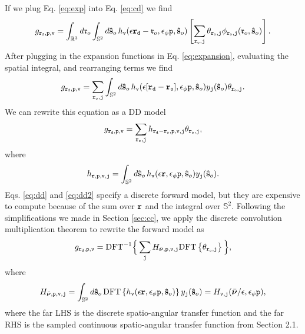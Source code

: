 \documentclass[11pt]{article}
\providecommand{\mb}[1]{\mathbf{#1}}
\providecommand{\ro}{\mathbf{\mathfrak{r}}_o}
\providecommand{\so}{\mathbf{\hat{s}}_o}
\providecommand{\mbb}[1]{\mathbb{#1}}
\providecommand{\bs}[1]{\boldsymbol{#1}}
\providecommand{\tv}{\texttt{v}}
\providecommand{\tb}[1]{\textbf{#1}}
\providecommand{\ttt}[1]{\texttt{#1}}
\providecommand{\intr}[1]{\int_{\mbb{R}^{#1}}}
\providecommand{\ints}[1]{\int_{\mbb{S}^{#1}}}
\begin{document}
If we plug Eq. \ref{eq:exp} into Eq. \ref{eq:cd} we find
\begin{align}
  g_{\tb{\ttt{r}}_{\ttt{d}},\ttt{p},\ttt{v}} = \intr{3}d\ro \ints{2}d\so\, h_{\tv}(\mb{\epsilon}\tb{\ttt{r}}_{\ttt{d}} - \ro, \mb{\epsilon}_{\phi}\ttt{p}, \so)\left[\sum_{\ttt{\tb{r}}_{\ttt{o}},\ttt{j}} \theta_{\ttt{\tb{r}}_{\ttt{o}},\ttt{j}} \phi_{\ttt{\tb{r}}_{\ttt{o}},\ttt{j}}(\ro, \so)\right].
\end{align}
After plugging in the expansion functions in Eq. \ref{eq:expansion}, evaluating
the spatial integral, and rearranging terms we find
\begin{align}
  g_{\tb{\ttt{r}}_{\ttt{d}},\ttt{p},\ttt{v}} = \sum_{\ttt{\tb{r}}_{\ttt{o}},\ttt{j}}\ints{2}d\so\, h_{\tv}(\mb{\epsilon}[\tb{\ttt{r}}_{\ttt{d}} - \tb{\ttt{r}}_{\ttt{o}}], \mb{\epsilon}_{\phi}\ttt{p}, \so)y_{\ttt{j}}(\so)\theta_{\ttt{\tb{r}}_{\ttt{o}},\ttt{j}}.
\end{align}
We can rewrite this equation as a DD model
\begin{align}
  g_{\tb{\ttt{r}}_{\ttt{d}},\ttt{p},\ttt{v}} = \sum_{\ttt{\tb{r}}_{\ttt{o}},\ttt{j}}h_{\ttt{\tb{r}}_{\ttt{d}} - \ttt{\tb{r}}_{\ttt{o}},\ttt{p},\ttt{v},\ttt{j}}\theta_{\ttt{\tb{r}}_{\ttt{o}},\ttt{j}},\label{eq:dd}
\end{align}
where
\begin{align}
h_{\ttt{\tb{r}},\ttt{p},\ttt{v},\ttt{j}} = \ints{2}d\so\, h_{\tv}(\mb{\epsilon}\tb{\ttt{r}}, \mb{\epsilon}_{\phi}\ttt{p}, \so)y_{\ttt{j}}(\so).\label{eq:dd2}
\end{align}
Eqs. \ref{eq:dd} and \ref{eq:dd2} specify a discrete forward model, but they are
expensive to compute because of the sum over $\ttt{\tb{r}}$ and the integral
over $\mbb{S}^2$. Following the simplifications we made in Section \ref{sec:cc}, we
apply the discrete convolution multiplication theorem to rewrite the forward
model as
\begin{align}
  g_{\tb{\ttt{r}}_{\ttt{d}},\ttt{p},\ttt{v}} = \text{DFT}^{-1}\Big\{\sum_{\ttt{j}}H_{\bar{\bs{\nu}},\ttt{p},\ttt{v},\ttt{j}}\text{DFT}\left\{\theta_{\ttt{\tb{r}}_{\ttt{o}},\ttt{j}}\right\}\Big\}, \label{eq:fastfwd}
\end{align}
where
\begin{align}
  H_{\bar{\bs{\nu}},\ttt{p},\ttt{v},\ttt{j}} = \ints{2}d\so\, \text{DFT}\left\{h_{\tv}(\mb{\epsilon}\tb{\ttt{r}}, \mb{\epsilon}_{\phi}\ttt{p}, \so)\right\}y_{\ttt{j}}(\so) = H_{\ttt{v}, \ttt{j}}(\bar{\bs{\nu}}/\epsilon, \epsilon_{\phi}\ttt{p}), 
\end{align}
where the far LHS is the discrete spatio-angular transfer function and the far
RHS is the sampled continuous spatio-angular transfer function from Section 2.1. 
\end{document}
